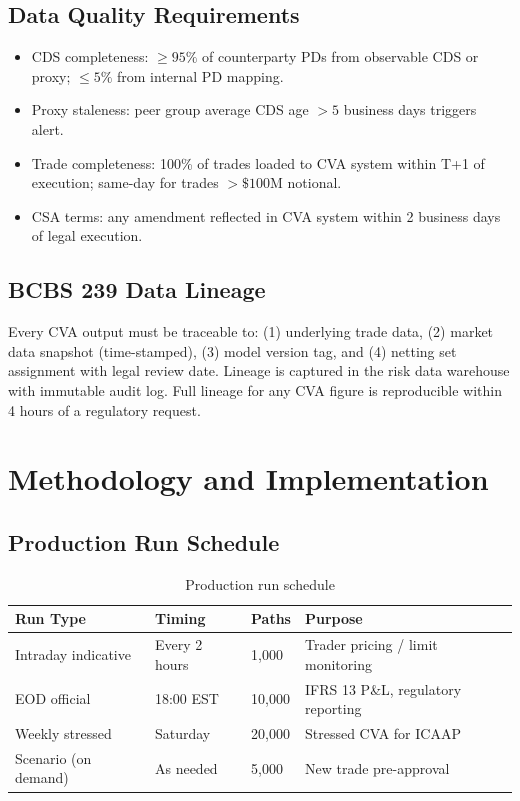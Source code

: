 \documentclass[11pt,a4paper]{article}
\begin{document}
\subsection{Data Quality Requirements}

\begin{itemize}[noitemsep]
  \item CDS completeness: $\geq 95\%$ of counterparty PDs from observable CDS
        or proxy; $\leq 5\%$ from internal PD mapping.
  \item Proxy staleness: peer group average CDS age $>5$ business days triggers
        alert.
  \item Trade completeness: 100\% of trades loaded to CVA system within T+1
        of execution; same-day for trades $>\$100$M notional.
  \item CSA terms: any amendment reflected in CVA system within 2 business days
        of legal execution.
\end{itemize}

\subsection{BCBS 239 Data Lineage}

Every CVA output must be traceable to: (1) underlying trade data, (2) market
data snapshot (time-stamped), (3) model version tag, and (4) netting set
assignment with legal review date. Lineage is captured in the risk data
warehouse with immutable audit log. Full lineage for any CVA figure is
reproducible within 4 hours of a regulatory request.

\section{Methodology and Implementation}

\subsection{Production Run Schedule}

\begin{table}[h!]
\centering
\begin{tabular}{@{}llll@{}}
\toprule
\textbf{Run Type} & \textbf{Timing} & \textbf{Paths} & \textbf{Purpose} \\
\midrule
Intraday indicative & Every 2 hours & 1,000  & Trader pricing / limit monitoring \\
EOD official        & 18:00 EST     & 10,000 & IFRS 13 P\&L, regulatory reporting \\
Weekly stressed     & Saturday      & 20,000 & Stressed CVA for ICAAP \\
Scenario (on demand) & As needed    & 5,000  & New trade pre-approval \\
\bottomrule
\end{tabular}
\caption{Production run schedule}
\end{table}
\end{document}
